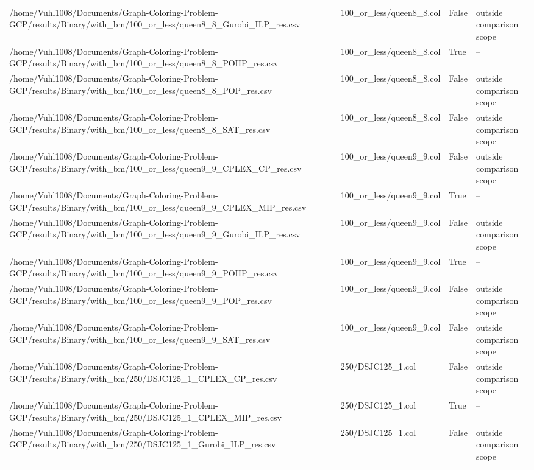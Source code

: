 \begin{table}[htbp]
\begin{tabular}{llll}
/home/Vuhl1008/Documents/Graph-Coloring-Problem-GCP/results/Binary/with\_bm/100\_or\_less/queen8\_8\_Gurobi\_ILP\_res.csv & 100\_or\_less/queen8\_8.col & False & outside comparison scope \\
/home/Vuhl1008/Documents/Graph-Coloring-Problem-GCP/results/Binary/with\_bm/100\_or\_less/queen8\_8\_POHP\_res.csv & 100\_or\_less/queen8\_8.col & True & -- \\
/home/Vuhl1008/Documents/Graph-Coloring-Problem-GCP/results/Binary/with\_bm/100\_or\_less/queen8\_8\_POP\_res.csv & 100\_or\_less/queen8\_8.col & False & outside comparison scope \\
/home/Vuhl1008/Documents/Graph-Coloring-Problem-GCP/results/Binary/with\_bm/100\_or\_less/queen8\_8\_SAT\_res.csv & 100\_or\_less/queen8\_8.col & False & outside comparison scope \\
/home/Vuhl1008/Documents/Graph-Coloring-Problem-GCP/results/Binary/with\_bm/100\_or\_less/queen9\_9\_CPLEX\_CP\_res.csv & 100\_or\_less/queen9\_9.col & False & outside comparison scope \\
/home/Vuhl1008/Documents/Graph-Coloring-Problem-GCP/results/Binary/with\_bm/100\_or\_less/queen9\_9\_CPLEX\_MIP\_res.csv & 100\_or\_less/queen9\_9.col & True & -- \\
/home/Vuhl1008/Documents/Graph-Coloring-Problem-GCP/results/Binary/with\_bm/100\_or\_less/queen9\_9\_Gurobi\_ILP\_res.csv & 100\_or\_less/queen9\_9.col & False & outside comparison scope \\
/home/Vuhl1008/Documents/Graph-Coloring-Problem-GCP/results/Binary/with\_bm/100\_or\_less/queen9\_9\_POHP\_res.csv & 100\_or\_less/queen9\_9.col & True & -- \\
/home/Vuhl1008/Documents/Graph-Coloring-Problem-GCP/results/Binary/with\_bm/100\_or\_less/queen9\_9\_POP\_res.csv & 100\_or\_less/queen9\_9.col & False & outside comparison scope \\
/home/Vuhl1008/Documents/Graph-Coloring-Problem-GCP/results/Binary/with\_bm/100\_or\_less/queen9\_9\_SAT\_res.csv & 100\_or\_less/queen9\_9.col & False & outside comparison scope \\
/home/Vuhl1008/Documents/Graph-Coloring-Problem-GCP/results/Binary/with\_bm/250/DSJC125\_1\_CPLEX\_CP\_res.csv & 250/DSJC125\_1.col & False & outside comparison scope \\
/home/Vuhl1008/Documents/Graph-Coloring-Problem-GCP/results/Binary/with\_bm/250/DSJC125\_1\_CPLEX\_MIP\_res.csv & 250/DSJC125\_1.col & True & -- \\
/home/Vuhl1008/Documents/Graph-Coloring-Problem-GCP/results/Binary/with\_bm/250/DSJC125\_1\_Gurobi\_ILP\_res.csv & 250/DSJC125\_1.col & False & outside comparison scope \\

\end{tabular}
\end{table}
